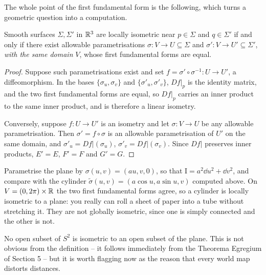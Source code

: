 \documentclass[a4paper]{scrartcl}
\begin{document}
The whole point of the first fundamental form is the following, which turns a geometric question into a computation.

\begin{lemma}
    Smooth surfaces $\Sigma, \Sigma'$ in $\mathbb{R}^3$ are locally isometric near $p \in \Sigma$ and $q \in \Sigma'$ if and only if there exist allowable parametrisations $\sigma: V \rightarrow U \subseteq \Sigma$ and $\sigma': V \rightarrow U' \subseteq \Sigma'$, \emph{with the same domain} $V$, whose first fundamental forms are equal.
\end{lemma}
\begin{proof}
    Suppose such parametrisations exist and set $f = \sigma' \circ \sigma^{-1}: U \rightarrow U'$, a diffeomorphism. In the bases $\{\sigma_u, \sigma_v\}$ and $\{\sigma'_u, \sigma'_v\}$, $\left.Df\right|_p$ is the identity matrix, and the two first fundamental forms are equal, so $\left.Df\right|_p$ carries an inner product to the same inner product, and is therefore a linear isometry.

    Conversely, suppose $f: U \rightarrow U'$ is an isometry and let $\sigma: V \rightarrow U$ be any allowable parametrisation. Then $\sigma' = f\circ\sigma$ is an allowable parametrisation of $U'$ on the same domain, and $\sigma'_u = \left.Df\right|(\sigma_u)$, $\sigma'_v = \left.Df\right|(\sigma_v)$. Since $\left.Df\right|$ preserves inner products, $E' = E$, $F' = F$ and $G' = G$.
\end{proof}

\begin{example}
    Parametrise the plane by $\sigma(u,v) = (au, v, 0)$, so that $\mathrm{I} = a^2\dd u^2 + \dd v^2$, and compare with the cylinder $\tilde\sigma(u, v) = (a\cos u, a\sin u, v)$ computed above. On $V = (0, 2\pi)\times\mathbb{R}$ the two first fundamental forms agree, so a cylinder is locally isometric to a plane: you really can roll a sheet of paper into a tube without stretching it. They are not globally isometric, since one is simply connected and the other is not.
\end{example}

\begin{example}
    No open subset of $S^2$ is isometric to an open subset of the plane. This is not obvious from the definition -- it follows immediately from the Theorema Egregium of Section 5 -- but it is worth flagging now as the reason that every world map distorts distances.
\end{example}
\end{document}

